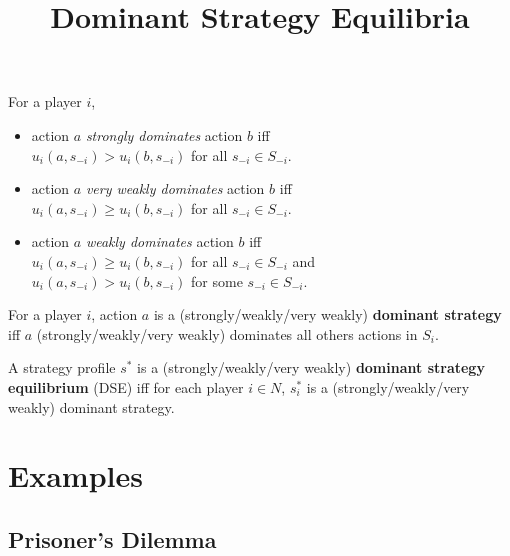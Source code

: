 
\usepackage{diagbox}
\usepackage{tikz}
\usetikzlibrary{arrows.meta}

\newcommand*{\shat}{\widehat{s}}

\title{Dominant Strategy Equilibria}



\maketitle
\initMinimal{}

\begin{definition}
For a player $i$,
\begin{itemize}
\item action $a$ \emph{strongly dominates} action $b$ iff
\\ $u_i(a, s_{-i}) > u_i(b, s_{-i})$ for all $s_{-i} \in S_{-i}$.
\item action $a$ \emph{very weakly dominates} action $b$ iff
\\ $u_i(a, s_{-i}) \ge u_i(b, s_{-i})$ for all $s_{-i} \in S_{-i}$.
\item action $a$ \emph{weakly dominates} action $b$ iff
\\ $u_i(a, s_{-i}) \ge u_i(b, s_{-i})$ for all $s_{-i} \in S_{-i}$ and
\\ $u_i(a, s_{-i}) > u_i(b, s_{-i})$ for some $s_{-i} \in S_{-i}$.
\end{itemize}
\end{definition}

\begin{definition}
For a player $i$, action $a$ is a (strongly/weakly/very weakly) \textbf{dominant strategy} iff
$a$ (strongly/weakly/very weakly) dominates all others actions in $S_i$.
\end{definition}

\begin{definition}
A strategy profile $s^*$ is a (strongly/weakly/very weakly) \textbf{dominant strategy equilibrium}
(DSE) iff for each player $i \in N$, $s^*_i$ is a (strongly/weakly/very weakly) dominant strategy.
\end{definition}

\section{Examples}

\subsection{Prisoner's Dilemma}

